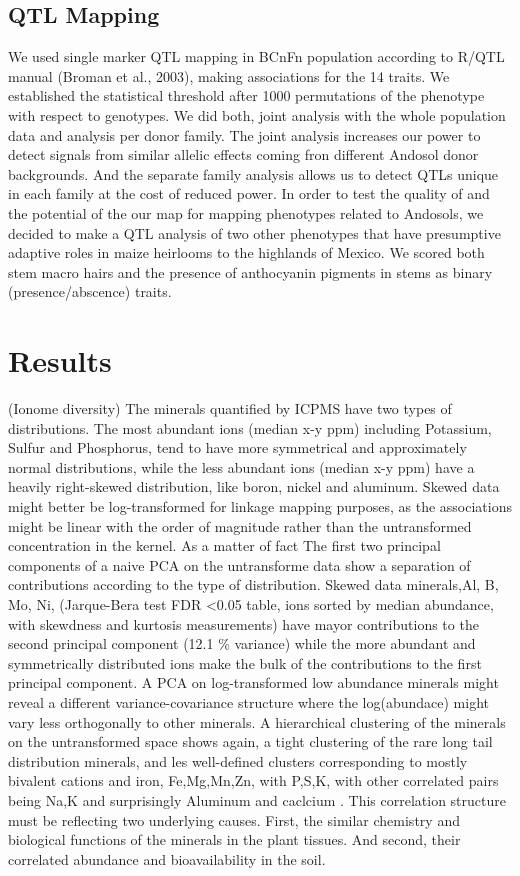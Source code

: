 \subsection{QTL Mapping}
We used single marker QTL mapping in BCnFn population according to R/QTL manual (Broman et al., 2003),  making associations for the 14 traits.  We established the statistical threshold after  1000 permutations of the phenotype with respect to genotypes.  We did both, joint analysis with the whole population data and analysis per donor family.
The joint analysis increases our power to detect signals from similar allelic effects coming fron different Andosol donor backgrounds.
And the separate family analysis allows us to detect QTLs unique in each family at the cost of reduced power.  In order to test the quality of and the potential of the our map for mapping phenotypes related to  Andosols, we decided to make  a QTL analysis of two other phenotypes that have presumptive adaptive roles in maize heirlooms to the highlands of Mexico.
We scored both stem macro hairs and  the presence of anthocyanin pigments in stems as binary (presence/abscence) traits. 

\section{Results}
\subsecion(Ionome diversity)
The minerals quantified by ICPMS have two types of distributions. The most abundant ions (median x-y ppm) including Potassium, Sulfur and Phosphorus, tend to have more symmetrical and approximately normal distributions, while the less abundant ions (median x-y ppm) have a  heavily right-skewed distribution, like boron, nickel and aluminum.
Skewed data might better be log-transformed for linkage mapping purposes, as the associations might be linear with the order of magnitude rather than the untransformed concentration in the kernel. As a matter of fact The first two principal components of a naive PCA on the untransforme data show a separation of contributions according to the type of distribution.
Skewed data minerals,Al, B, Mo, Ni, (Jarque-Bera test FDR <0.05 table, ions sorted by median abundance, with skewdness and kurtosis measurements) have mayor contributions to the second principal component (12.1 \% variance) while the more abundant and symmetrically distributed ions make the bulk of the contributions to the first principal component.
A PCA on log-transformed low abundance minerals might reveal a different variance-covariance structure where the log(abundace) might vary less orthogonally to other minerals. A hierarchical clustering of the minerals on the untransformed space shows again, a tight clustering of the rare long tail distribution minerals, and les well-defined clusters corresponding to mostly bivalent cations and iron, Fe,Mg,Mn,Zn, with P,S,K, with other correlated pairs being Na,K and surprisingly Aluminum and  caclcium . This correlation structure must be reflecting two underlying causes.
First, the similar chemistry and biological functions of the minerals in the plant tissues. And second, their correlated abundance and bioavailability in the soil.

